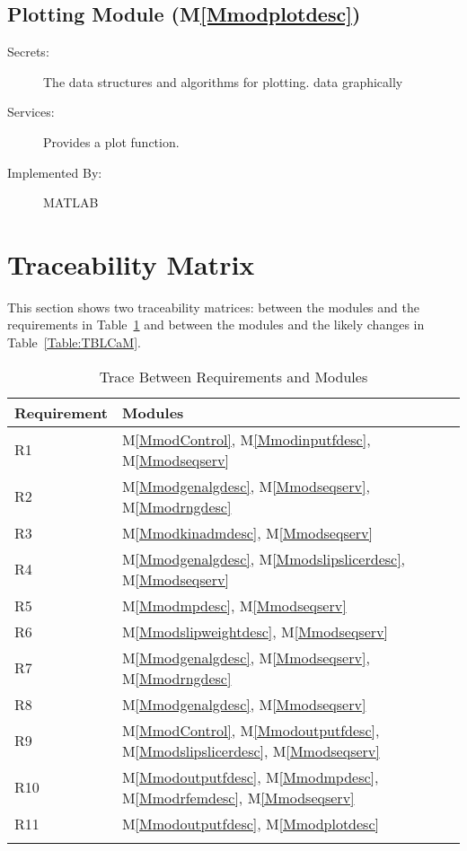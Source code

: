 \documentclass[12pt]{article}
\begin{document}
\subsection{Plotting Module (M\ref{Mmodplotdesc})}
\label{Sec:PM()}
\begin{description}
\item[Secrets:]The data structures and algorithms for plotting. data graphically
\item[Services:]Provides a plot function.
\item[Implemented By:]MATLAB
\end{description}
\section{Traceability Matrix}
\label{Sec:TM}
This section shows two traceability matrices: between the modules and the requirements in Table~\ref{Table:TBRaM} and between the modules and the likely changes in Table~\ref{Table:TBLCaM}.
\begin{longtable}{l l}
\toprule
Requirement & Modules
\\
\midrule
R1 & M\ref{MmodControl}, M\ref{Mmodinputfdesc}, M\ref{Mmodseqserv}
\\
R2 & M\ref{Mmodgenalgdesc}, M\ref{Mmodseqserv}, M\ref{Mmodrngdesc}
\\
R3 & M\ref{Mmodkinadmdesc}, M\ref{Mmodseqserv}
\\
R4 & M\ref{Mmodgenalgdesc}, M\ref{Mmodslipslicerdesc}, M\ref{Mmodseqserv}
\\
R5 & M\ref{Mmodmpdesc}, M\ref{Mmodseqserv}
\\
R6 & M\ref{Mmodslipweightdesc}, M\ref{Mmodseqserv}
\\
R7 & M\ref{Mmodgenalgdesc}, M\ref{Mmodseqserv}, M\ref{Mmodrngdesc}
\\
R8 & M\ref{Mmodgenalgdesc}, M\ref{Mmodseqserv}
\\
R9 & M\ref{MmodControl}, M\ref{Mmodoutputfdesc}, M\ref{Mmodslipslicerdesc}, M\ref{Mmodseqserv}
\\
R10 & M\ref{Mmodoutputfdesc}, M\ref{Mmodmpdesc}, M\ref{Mmodrfemdesc}, M\ref{Mmodseqserv}
\\
R11 & M\ref{Mmodoutputfdesc}, M\ref{Mmodplotdesc}
\\
\bottomrule
\caption{Trace Between Requirements and Modules}
\label{Table:TBRaM}
\end{longtable}
\end{document}
